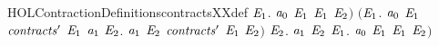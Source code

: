 \begin{SaveVerbatim}{HOLContractionDefinitionscontractsXXdef}
                   \HOLSymConst{\HOLTokenExists{}}\ensuremath{\HOLBoundVar{E}\sb{\mathrm{1}}}. \ensuremath{\HOLBoundVar{a}\sb{\mathrm{0}}} \HOLTokenWeakTransBegin{} \HOLTokenWeakTransEnd \ensuremath{\HOLBoundVar{E}\sb{\mathrm{1}}} \HOLSymConst{\HOLTokenConj{}}  \ensuremath{\HOLBoundVar{E}\sb{\mathrm{1}}} \ensuremath{\HOLBoundVar{E}\sb{\mathrm{2}}}\ensuremath{)} \HOLSymConst{\HOLTokenConj{}}
            \ensuremath{(}\HOLSymConst{\HOLTokenForall{}}\ensuremath{\HOLBoundVar{E}\sb{\mathrm{1}}}.
               \ensuremath{\HOLBoundVar{a}\sb{\mathrm{0}}} \HOLTokenTransBegin\HOLConst{\ensuremath{\tau}}\HOLTokenTransEnd \ensuremath{\HOLBoundVar{E}\sb{\mathrm{1}}} \HOLSymConst{\HOLTokenImp{}}
               \ensuremath{\HOLBoundVar{contracts}\sp{\prime{}}} \ensuremath{\HOLBoundVar{E}\sb{\mathrm{1}}} \ensuremath{\HOLBoundVar{a}\sb{\mathrm{1}}} \HOLSymConst{\HOLTokenDisj{}}
               \HOLSymConst{\HOLTokenExists{}}\ensuremath{\HOLBoundVar{E}\sb{\mathrm{2}}}. \ensuremath{\HOLBoundVar{a}\sb{\mathrm{1}}} \HOLTokenTransBegin\HOLConst{\ensuremath{\tau}}\HOLTokenTransEnd \ensuremath{\HOLBoundVar{E}\sb{\mathrm{2}}} \HOLSymConst{\HOLTokenConj{}} \ensuremath{\HOLBoundVar{contracts}\sp{\prime{}}} \ensuremath{\HOLBoundVar{E}\sb{\mathrm{1}}} \ensuremath{\HOLBoundVar{E}\sb{\mathrm{2}}}\ensuremath{)} \HOLSymConst{\HOLTokenConj{}}
            \HOLSymConst{\HOLTokenForall{}}\ensuremath{\HOLBoundVar{E}\sb{\mathrm{2}}}. \ensuremath{\HOLBoundVar{a}\sb{\mathrm{1}}} \HOLTokenTransBegin\HOLConst{\ensuremath{\tau}}\HOLTokenTransEnd \ensuremath{\HOLBoundVar{E}\sb{\mathrm{2}}} \HOLSymConst{\HOLTokenImp{}} \HOLSymConst{\HOLTokenExists{}}\ensuremath{\HOLBoundVar{E}\sb{\mathrm{1}}}.  \ensuremath{\HOLBoundVar{a}\sb{\mathrm{0}}} \ensuremath{\HOLBoundVar{E}\sb{\mathrm{1}}} \HOLSymConst{\HOLTokenConj{}}  \ensuremath{\HOLBoundVar{E}\sb{\mathrm{1}}} \ensuremath{\HOLBoundVar{E}\sb{\mathrm{2}}}\ensuremath{)}
\end{SaveVerbatim}
\newcommand{\HOLContractionDefinitionscontractsXXdef}{\UseVerbatim{HOLContractionDefinitionscontractsXXdef}}

